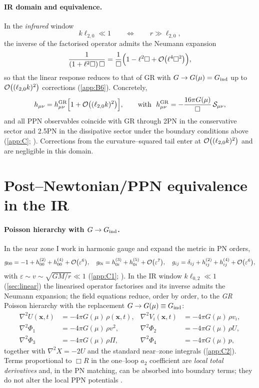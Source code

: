 \documentclass{iopjournal}
\begin{document}
\paragraph{IR domain and equivalence.}
In the \emph{infrared} window
\begin{equation}
k\ell_{2,0}\ll1\qquad\Longleftrightarrow\qquad r\gg \ell_{2,0},
\label{eq:lin_IRwindow}
\end{equation}
the inverse of the factorised operator admits the Neumann expansion
\[
\frac{1}{(1+\ell^2\Box)\,\Box}=\frac{1}{\Box}\Big(1-\ell^2\Box+\order{\ell^4\Box^2}\Big),
\]
so that the linear response reduces to that of GR with $G\to G(\mu)=G_{\rm ind}$ up to $\order{(\ell_{2,0}k)^2}$ corrections (\cref{app:B6}). Concretely,
\begin{equation}
h_{\mu\nu}=h_{\mu\nu}^{\rm GR}\Big[1+\order{(\ell_{2,0}k)^2}\Big],\qquad
\text{with}\ \ h_{\mu\nu}^{\rm GR}=-\frac{16\pi G(\mu)}{\Box}\,\mathcal S_{\mu\nu},
\label{eq:lin_equivalence}
\end{equation}
and all PPN observables coincide with GR through 2PN in the conservative sector and 2.5PN in the dissipative sector under the boundary conditions above (\cref{app:C}; \cite{PoissonWill2014,Will2014LRR,Blanchet2014LRR}). Corrections from the curvature–squared tail enter at $\order{(\ell_{2,0}k)^2}$ and are negligible in this domain.

\section{Post–Newtonian/PPN equivalence in the IR}\label{sec:ppn}
\paragraph{Poisson hierarchy with $G\to G_{\rm ind}$.}
In the near zone I work in harmonic gauge and expand the metric in PN orders,
\[
g_{00}=-1+h_{00}^{(2)}+h_{00}^{(4)}+\order{\varepsilon^{6}},\quad
g_{0i}=h_{0i}^{(3)}+h_{0i}^{(5)}+\order{\varepsilon^{7}},\quad
g_{ij}=\delta_{ij}+h_{ij}^{(2)}+h_{ij}^{(4)}+\order{\varepsilon^{6}},
\]
with $\varepsilon\sim v\sim\sqrt{GM/r}\ll1$ (\cref{app:C1}; \cite{PoissonWill2014,Blanchet2014LRR}). In the IR window $k\ell_{0,2}\ll1$ (\cref{sec:linear}) the linearised operator factorises and its inverse admits the Neumann expansion; the field equations reduce, order by order, to the \emph{GR} Poisson hierarchy with the replacement $G\to G(\mu)\equiv G_{\rm ind}$:
\begin{align}
\nabla^2 U(\boldsymbol x,t)&=-4\pi G(\mu)\,\rho(\boldsymbol x,t), &
\nabla^2 V_i(\boldsymbol x,t)&=-4\pi G(\mu)\,\rho v_i, \label{eq:ppn_Poisson1}\\
\nabla^2 \Phi_1&=-4\pi G(\mu)\,\rho v^2, &
\nabla^2 \Phi_2&=-4\pi G(\mu)\,\rho U, \\
\nabla^2 \Phi_3&=-4\pi G(\mu)\,\rho \Pi, &
\nabla^2 \Phi_4&=-4\pi G(\mu)\,p, \label{eq:ppn_Poisson2}
\end{align}
together with $\nabla^2 X=-2U$ and the standard near–zone integrals (\cref{app:C2}). Terms proportional to $\Box R$ in the one–loop $a_2$ coefficient are \emph{local total derivatives} and, in the PN matching, can be absorbed into boundary terms; they do not alter the local PPN potentials \cite{ParkerToms,Vassilevich2003}.
\end{document}

